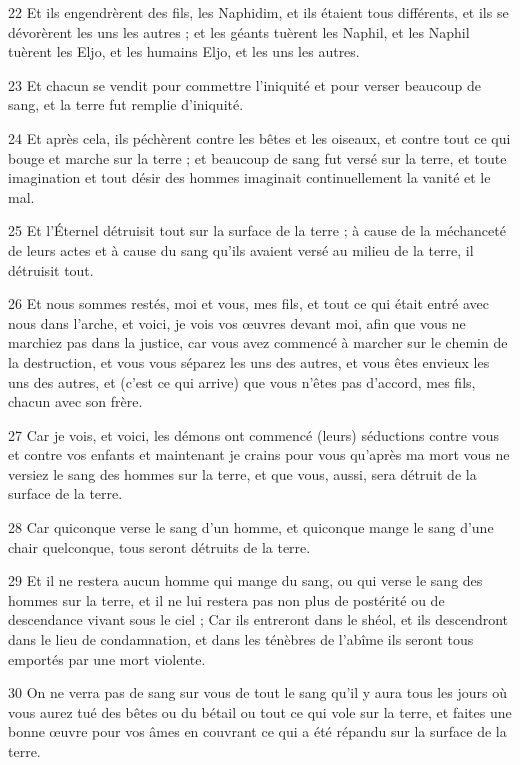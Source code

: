 \par 22 Et ils engendrèrent des fils, les Naphidim, et ils étaient tous différents, et ils se dévorèrent les uns les autres ; et les géants tuèrent les Naphil, et les Naphil tuèrent les Eljo, et les humains Eljo, et les uns les autres.
\par 23 Et chacun se vendit pour commettre l'iniquité et pour verser beaucoup de sang, et la terre fut remplie d'iniquité.
\par 24 Et après cela, ils péchèrent contre les bêtes et les oiseaux, et contre tout ce qui bouge et marche sur la terre ; et beaucoup de sang fut versé sur la terre, et toute imagination et tout désir des hommes imaginait continuellement la vanité et le mal.
\par 25 Et l'Éternel détruisit tout sur la surface de la terre ; à cause de la méchanceté de leurs actes et à cause du sang qu'ils avaient versé au milieu de la terre, il détruisit tout.
\par 26 Et nous sommes restés, moi et vous, mes fils, et tout ce qui était entré avec nous dans l'arche, et voici, je vois vos œuvres devant moi, afin que vous ne marchiez pas dans la justice, car vous avez commencé à marcher sur le chemin de la destruction, et vous vous séparez les uns des autres, et vous êtes envieux les uns des autres, et (c'est ce qui arrive) que vous n'êtes pas d'accord, mes fils, chacun avec son frère.
\par 27 Car je vois, et voici, les démons ont commencé (leurs) séductions contre vous et contre vos enfants et maintenant je crains pour vous qu'après ma mort vous ne versiez le sang des hommes sur la terre, et que vous, aussi, sera détruit de la surface de la terre.
\par 28 Car quiconque verse le sang d'un homme, et quiconque mange le sang d'une chair quelconque, tous seront détruits de la terre.
\par 29 Et il ne restera aucun homme qui mange du sang, ou qui verse le sang des hommes sur la terre, et il ne lui restera pas non plus de postérité ou de descendance vivant sous le ciel ; Car ils entreront dans le shéol, et ils descendront dans le lieu de condamnation, et dans les ténèbres de l'abîme ils seront tous emportés par une mort violente.
\par 30 On ne verra pas de sang sur vous de tout le sang qu'il y aura tous les jours où vous aurez tué des bêtes ou du bétail ou tout ce qui vole sur la terre, et faites une bonne œuvre pour vos âmes en couvrant ce qui a été répandu sur la surface de la terre.
